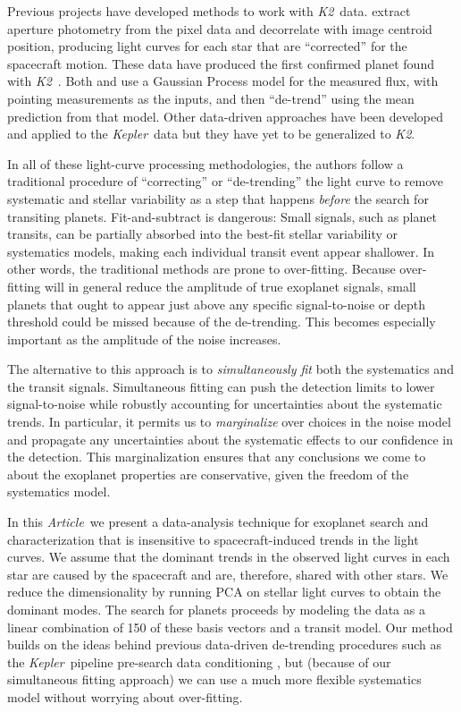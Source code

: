 \documentclass[12pt,preprint]{aastex}
\newcommand{\project}[1]{\textsl{#1}} %
\newcommand{\kepler}{\project{Kepler}}
\newcommand{\KT}{\project{K2}}
\newcommand{\pdc}{\project{PDC}}
\newcommand{\paper}{\textsl{Article}}
\begin{document}
Previous projects have developed methods to work with \KT\ data.
\citet{Vanderburg:2014} extract aperture photometry from the pixel data
and decorrelate with image centroid position, producing light curves for each
star that are ``corrected'' for the spacecraft motion.
These data have produced the first confirmed planet found with
\KT\ \citep{Vanderburg:2015}.
Both \citet{Aigrain:2015} and \citet{Crossfield:2015} use a Gaussian Process
model for the measured flux, with pointing measurements as the inputs, and
then ``de-trend'' using the mean prediction from that model.
Other data-driven approaches have been developed and applied to the \kepler\
data \citep[for example,][]{pdc1, pdc2, arc, dun} but they have yet to be
generalized to \KT.

In all of these light-curve processing methodologies, the authors follow a
traditional procedure of ``correcting'' or ``de-trending'' the light curve to
remove systematic and stellar variability as a step that happens \emph{before}
the search for transiting planets.
Fit-and-subtract is dangerous:
Small signals, such as planet transits, can be
partially absorbed into the best-fit stellar variability or systematics
models, making each individual transit event appear shallower.
In other words, the traditional methods are prone to over-fitting.
Because over-fitting will in general reduce the amplitude of true exoplanet
signals, small planets that ought to appear just above any specific
signal-to-noise or depth threshold could be missed because of the de-trending.
This becomes especially important as the amplitude of the noise increases.

The alternative to this approach is to \emph{simultaneously fit} both the systematics
and the transit signals.
Simultaneous fitting can push the detection limits to lower signal-to-noise while
robustly accounting for uncertainties about the systematic trends.
In particular, it permits us to \emph{marginalize} over choices in the noise
model and propagate any uncertainties about the systematic effects
to our confidence in the detection.
This marginalization ensures that any conclusions we come to about the exoplanet
properties are conservative, given the freedom of the systematics model.

In this \paper\ we present a data-analysis technique for exoplanet search and
characterization that is insensitive to spacecraft-induced trends in the light
curves.
We assume that the dominant trends in the observed light curves in each star
are caused by the spacecraft and are, therefore, shared with other stars.
We reduce the dimensionality by running PCA on stellar light curves to obtain
the dominant modes.
The search for planets proceeds by modeling the data as a linear combination of
150 of these basis vectors and a transit model.
Our method builds on the ideas behind previous data-driven de-trending
procedures such as the \kepler\ pipeline pre-search data conditioning
\citep[\pdc;][]{pdc1, pdc2}, but (because of our simultaneous fitting
approach) we can use a much more flexible systematics model without worrying
about over-fitting.
\end{document}
